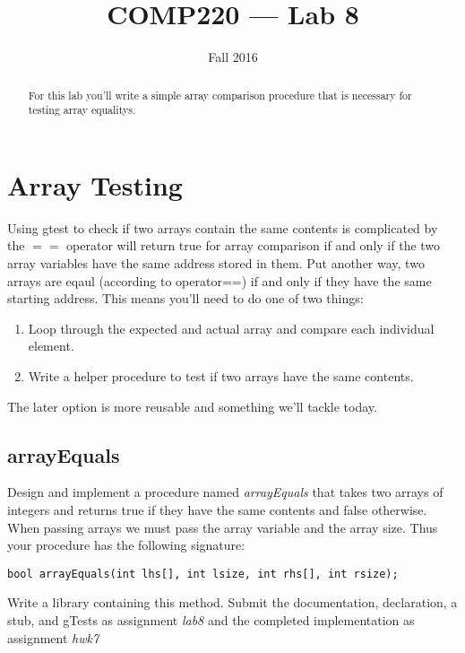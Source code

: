 \documentclass[10pt]{article}
\title{COMP220 --- Lab 8}
\author{ }
\date{Fall 2016}
\begin{document}
\maketitle
\thispagestyle{empty}

\begin{abstract}
For this lab you'll write a simple array comparison procedure that is necessary for testing array equalitys. 
\end{abstract}


\section*{Array Testing}

Using gtest to check if two arrays contain the same contents is complicated by the $==$ operator will return true for array comparison if and only if the two array variables have the same address stored in them. Put another way, two arrays are eqaul (according to operator==) if and only if they have the same starting address. This means you'll need to do one of two things:
\begin{enumerate}
\item Loop through the expected and actual array and compare each individual element.
\item Write a helper procedure to test if two arrays have the same contents. 
\end{enumerate}

The later option is more reusable and something we'll tackle today. 

\subsection*{arrayEquals}

Design and implement a procedure named \textit{arrayEquals} that takes two arrays of integers and returns true if they have the same contents and false otherwise. When passing arrays we must pass the array variable and the array size.  Thus your procedure has the following signature:

\begin{lstlisting}
bool arrayEquals(int lhs[], int lsize, int rhs[], int rsize);
\end{lstlisting}

Write a library containing this method. Submit the documentation, declaration, a stub, and gTests as assignment \textit{lab8} and the completed implementation as assignment \textit{hwk7}
\end{document}
